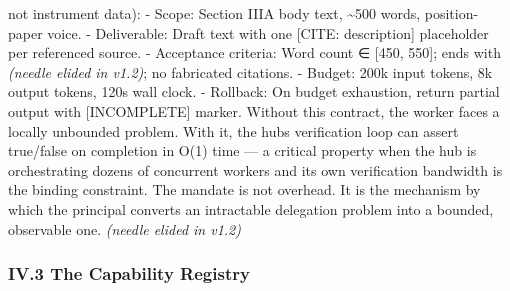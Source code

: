\documentclass[
]{article}
\begin{document}
not instrument data): - Scope: Section IIIA body text,
\textasciitilde500 words, position-paper voice. - Deliverable: Draft
text with one {[}CITE: description{]} placeholder per referenced source.
- Acceptance criteria: Word count ∈ {[}450, 550{]}; ends with
\emph{(needle elided in v1.2)}; no fabricated citations. - Budget: 200k
input tokens, 8k output tokens, 120s wall clock. - Rollback: On budget
exhaustion, return partial output with {[}INCOMPLETE{]} marker. Without
this contract, the worker faces a locally unbounded problem. With it,
the hub\textquotesingle s verification loop can assert true/false on
completion in O(1) time --- a critical property when the hub is
orchestrating dozens of concurrent workers and its own verification
bandwidth is the binding constraint. The mandate is not overhead. It is
the mechanism by which the principal converts an intractable delegation
problem into a bounded, observable one. \emph{(needle elided in v1.2)}

\subsubsection{IV.3 The Capability
Registry}\label{iv3-the-capability-registry}
\end{document}
